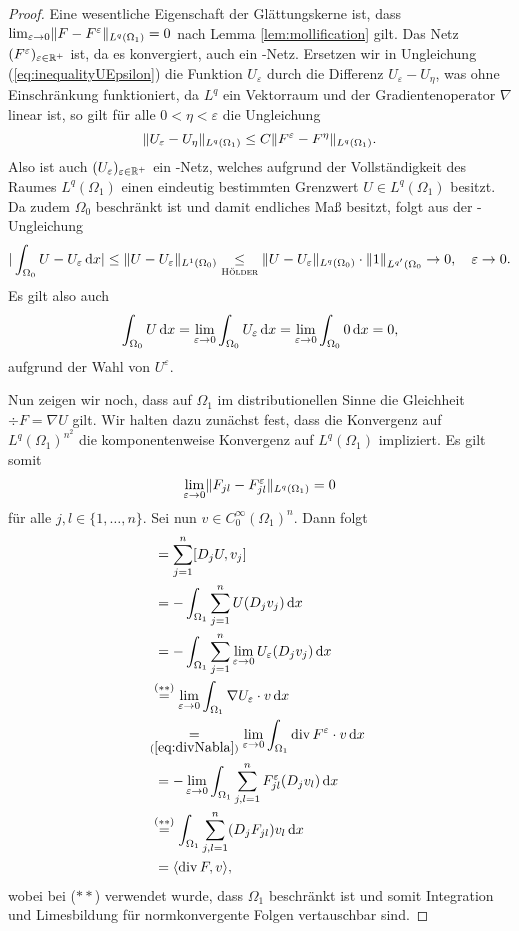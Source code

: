 \begin{proof}
  Eine wesentliche Eigenschaft der Glättungskerne ist, dass $\lim_{\varepsilon \to 0} \norm{F - F^\varepsilon}_{L^q(\Omega_1)} = 0$ nach Lemma \ref{lem:mollification} gilt.
  Das Netz $(F^\varepsilon)_{\varepsilon \in \R^+}$ ist, da es konvergiert, auch ein \cauchy-Netz.
  Ersetzen wir in Ungleichung (\ref{eq:inequalityUEpsilon}) die Funktion $U_\varepsilon$ durch die Differenz $U_\varepsilon - U_\eta$, was ohne Einschränkung funktioniert, da $L^q$ ein Vektorraum und der Gradientenoperator $\nabla$ linear ist, so gilt für alle $0 < \eta < \varepsilon$ die Ungleichung
  $$
    \norm{U_\varepsilon - U_\eta}_{L^q(\Omega_1)}
    \leq C \norm{F^\varepsilon - F^\eta}_{L^q(\Omega_1)}.
  $$
  Also ist auch $(U_\varepsilon)_{\varepsilon \in \R^+}$ ein \cauchy-Netz, welches aufgrund der Vollständigkeit des Raumes $L^q(\Omega_1)$ einen eindeutig bestimmten Grenzwert $U \in L^q(\Omega_1)$ besitzt.
  Da zudem $\Omega_0$ beschränkt ist und damit endliches Maß besitzt, folgt aus der \hoelder\hyp{}Ungleichung
  $$
    | \int_{\Omega_0} U - U_\varepsilon \d x |
    \leq  \norm{U - U_\varepsilon}_{L^1(\Omega_0)} 
    \underset{\hoelder}{\leq} \norm{U - U_\varepsilon}_{L^q(\Omega_0)}\cdot \norm{1}_{L^{q'}(\Omega_0}
    \to 0, \quad \varepsilon \to 0.
  $$
  Es gilt also auch
  $$
  \int_{\Omega_0} U \d x = \lim_{\varepsilon \to 0} \int_{\Omega_0} U_\varepsilon \d x = \lim_{\varepsilon \to 0} \int_{\Omega_0} 0 \d x =  0,
  $$
  aufgrund der Wahl von $U^\varepsilon$.

  Nun zeigen wir noch, dass auf $\Omega_1$ im distributionellen Sinne die Gleichheit $\div F = \nabla U$ gilt. 
  Wir halten dazu zunächst fest, dass die Konvergenz auf $L^q(\Omega_1)^{n^2}$ die komponentenweise Konvergenz auf $L^q(\Omega_1)$ impliziert.
  Es gilt somit $$\lim_{\varepsilon \to 0} \norm{F_{jl} - F_{jl}^\varepsilon}_{L^q(\Omega_1)} = 0$$ für alle $j,l \in \{ 1,\dots,n\}$.
  Sei nun $v \in C_0^\infty(\Omega_1)^n$.
  Dann folgt
  \begin{align*}
    [\nabla U, v]
    &= \sum_{j = 1}^n [D_jU, v_j]\\
    &= -\int_{\Omega_1} \sum_{j = 1}^n U (D_j v_j) \d x \\ 
    &= -\int_{\Omega_1} \sum_{j = 1}^n \lim_{\varepsilon \to 0} U_\varepsilon (D_j v_j) \d x \\
    &\hspace{-0.10cm}\overset{(\ast\ast)}{=} \lim_{\varepsilon \to 0} \int_{\Omega_1} \nabla U_\varepsilon \cdot v \d x \\
    &\hspace{-0.21cm}\underset{(\ref{eq:divNabla})}{=} \lim_{\varepsilon \to 0} \int_{\Omega_1} \div F^\varepsilon \cdot v \d x \\
    &= -\lim_{\varepsilon \to 0} \int_{\Omega_1} \sum_{j,l=1}^n F_{jl}^\varepsilon (D_j v_l) \d x \\
    &\hspace{-0.10cm}\overset{(\ast\ast)}{=} \int_{\Omega_1} \sum_{j,l=1}^n (D_j F_{jl}) v_l \d x \\
    &= \langle \div F, v \rangle,
  \end{align*}
  wobei bei ($\ast\ast$) verwendet wurde, dass $\Omega_1$ beschränkt ist und somit Integration und Limesbildung für normkonvergente Folgen vertauschbar sind.


\end{proof}
